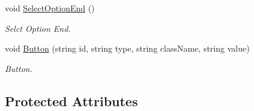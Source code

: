\begin{DoxyCompactItemize}
void \hyperlink{classHTMLTags_ae312980d20e3dea0469fdcb730fb975e}{Select\-Option\-End} ()
\begin{DoxyCompactList}\small\item\em Selct Option End. \end{DoxyCompactList}\item 
void \hyperlink{classHTMLTags_ab6dbb027d808e7b708a4ece7e911ceee}{Button} (string id, string type, string class\-Name, string value)
\begin{DoxyCompactList}\small\item\em Button. \end{DoxyCompactList}\end{DoxyCompactItemize}
\subsection*{Protected Attributes}
